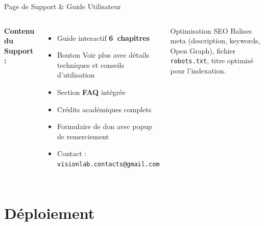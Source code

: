 \documentclass[aspectratio=169, 11pt]{beamer}
\begin{document}
\begin{frame}{Page de Support \& Guide Utilisateur}
  \begin{columns}[T]

    \textbf{\textcolor{uy1blue}{Contenu du Support :}}
    \begin{itemize}
      \item Guide interactif \textbf{6~chapitres}
      \item Bouton \og Voir plus \fg{} avec détails techniques et conseils d'utilisation
      \item Section \textbf{FAQ} intégrée
      \item Crédits académiques complets
      \item Formulaire de don avec popup de remerciement
      \item Contact : \texttt{visionlab.contacts@gmail.com}
    \end{itemize}
    \vspace{4pt}
    \begin{block}{Optimisation SEO}
      \footnotesize
      Balises meta (description, keywords, Open Graph), fichier \texttt{robots.txt}, titre optimisé pour l'indexation.
    \end{block}
  \end{columns}
\end{frame}

\section{Déploiement}
\end{document}
